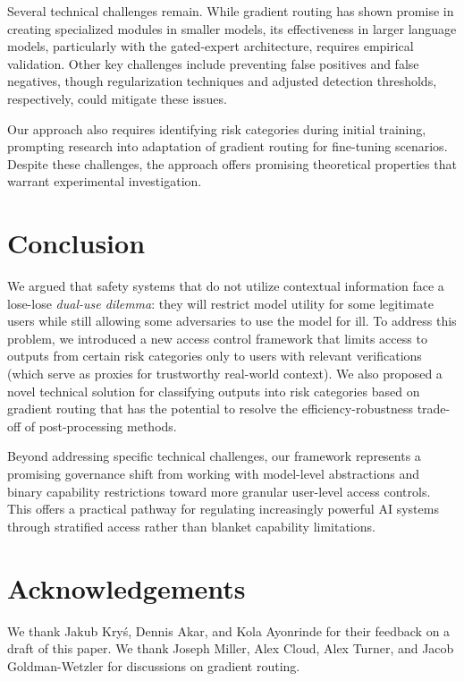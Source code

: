 \documentclass{article}
\theoremstyle{plain}
\theoremstyle{definition}
\theoremstyle{remark}
\begin{document}
Several technical challenges remain.
While gradient routing has shown promise in creating specialized modules in smaller models, its effectiveness in larger language models, particularly with the gated-expert architecture, requires empirical validation.
Other key challenges include preventing false positives and false negatives, though regularization techniques and adjusted detection thresholds, respectively, could mitigate these issues.

Our approach also requires identifying risk categories during initial training, prompting research into adaptation of gradient routing for fine-tuning scenarios.
Despite these challenges, the approach offers promising theoretical properties that warrant experimental investigation.

\section{Conclusion}

We argued that safety systems that do not utilize contextual
information face a lose-lose \emph{dual-use dilemma}: they will
restrict model utility for some legitimate users while still allowing
some adversaries to use the model for ill. To address this problem,
we introduced a new access control framework that limits access to
outputs from certain risk categories only to users with relevant
verifications (which serve as proxies for trustworthy real-world
context). We also proposed a novel technical solution for classifying
outputs into risk categories based on gradient routing that has the
potential to resolve the efficiency-robustness trade-off of
post-processing methods.

Beyond addressing specific technical challenges, our framework
represents a promising governance shift from working with model-level
abstractions and binary capability restrictions toward more granular
user-level access controls. This offers a practical pathway for
regulating increasingly powerful AI systems through stratified access
rather than blanket capability limitations.

\section*{Acknowledgements}

We thank Jakub Kryś, Dennis Akar, and Kola Ayonrinde for their feedback on a draft of this paper. We thank Joseph Miller, Alex Cloud, Alex Turner, and Jacob Goldman-Wetzler for discussions on gradient routing.
\end{document}

